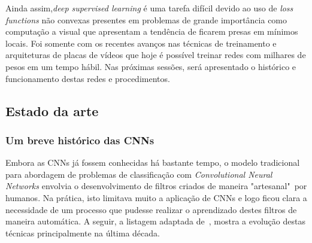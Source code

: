 Ainda assim,\emph{deep supervised learning} é uma tarefa difícil devido ao uso
de \emph{loss functions} não convexas presentes em problemas de grande
importância como computação a visual que apresentam a tendência de ficarem
presas em mínimos locais. Foi somente com os recentes avanços nas técnicas de
treinamento e arquiteturas de placas de vídeos que hoje é possível treinar
redes com milhares de pesos em um tempo hábil. Nas próximas sessões, será
apresentado o histórico e funcionamento destas redes e procedimentos.

\subsection{Estado da arte}

\subsubsection{Um breve histórico das CNNs}

Embora as CNNs já fossem conhecidas há bastante tempo, o modelo tradicional
para abordagem de problemas de classificação com \emph{Convolutional Neural
  Networks} envolvia o desenvolvimento de filtros criados de maneira
"artesanal"~por humanos. Na prática, isto limitava muito a aplicação de CNNs e
logo ficou clara a necessidade de um processo que pudesse realizar o
aprendizado destes filtros de maneira automática. A seguir, a listagem adaptada
de~\citet{cs231n}, mostra a evolução destas técnicas principalmente na última
década.

